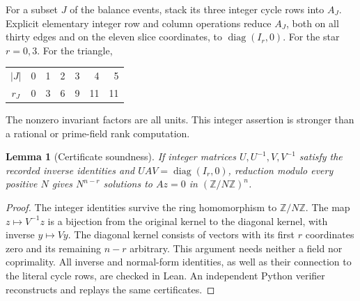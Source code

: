 \documentclass[11pt]{article}
\newtheorem{lemma}[theorem]{Lemma}
\newcommand{\Z}{\mathbb Z}
\begin{document}
For a subset $J$ of the balance events, stack its three integer cycle rows
into $A_J$. Explicit elementary integer row and column operations reduce
$A_J$, both on all thirty edges and on the eleven slice coordinates, to
$\operatorname{diag}(I_r,0)$. For the star $r=0,3$. For the triangle,
\begin{center}
\begin{tabular}{c@{\qquad}rrrrrr}
\toprule
$|J|$&0&1&2&3&4&5\\
$r_J$&0&3&6&9&11&11\\
\bottomrule
\end{tabular}
\end{center}
The nonzero invariant factors are all units. This integer assertion is stronger
than a rational or prime-field rank computation.

\begin{lemma}[Certificate soundness]\label{lem:integer}
If integer matrices $U,U^{-1},V,V^{-1}$ satisfy the recorded inverse identities
and $UAV=\operatorname{diag}(I_r,0)$, reduction modulo every positive $N$
gives $N^{n-r}$ solutions to $Az=0$ in $(\Z/N\Z)^n$.
\end{lemma}
\begin{proof}
The integer identities survive the ring homomorphism to $\Z/N\Z$. The map
$z\mapsto V^{-1}z$ is a bijection from the original kernel to the diagonal
kernel, with inverse $y\mapsto Vy$. The diagonal kernel consists of vectors
with its first $r$ coordinates zero and its remaining $n-r$ arbitrary. This
argument needs neither a field nor coprimality. All inverse and normal-form
identities, as well as their connection to the literal cycle rows, are checked
in Lean. An independent Python verifier reconstructs and replays the same
certificates.
\end{proof}
\end{document}
